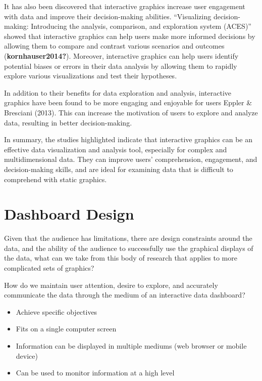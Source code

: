 \documentclass[print]{nuthesis}
\providecommand{\tightlist}{%
  \setlength{\itemsep}{0pt}\setlength{\parskip}{0pt}}
\begin{document}
It has also been discovered that interactive graphics increase user engagement with data and improve their decision-making abilities.
``Visualizing decision-making: Introducing the analysis, comparison, and exploration system (ACES)'' showed that interactive graphics can help users make more informed decisions by allowing them to compare and contrast various scenarios and outcomes (\textbf{kornhauser2014?}).
Moreover, interactive graphics can help users identify potential biases or errors in their data analysis by allowing them to rapidly explore various visualizations and test their hypotheses.

In addition to their benefits for data exploration and analysis, interactive graphics have been found to be more engaging and enjoyable for users Eppler \& Bresciani (2013).
This can increase the motivation of users to explore and analyze data, resulting in better decision-making.

In summary, the studies highlighted indicate that interactive graphics can be an effective data visualization and analysis tool, especially for complex and multidimensional data.
They can improve users' comprehension, engagement, and decision-making skills, and are ideal for examining data that is difficult to comprehend with static graphics.

\hypertarget{dashboard-design}{%
\section{Dashboard Design}\label{dashboard-design}}

Given that the audience has limitations, there are design constraints around the data, and the ability of the audience to successfully use the graphical displays of the data, what can we take from this body of research that applies to more complicated sets of graphics?

How do we maintain user attention, desire to explore, and accurately communicate the data through the medium of an interactive data dashboard?


\begin{itemize}
\tightlist
\item
  Achieve specific objectives
\item
  Fits on a single computer screen
\item
  Information can be displayed in multiple mediums (web browser or mobile device)
\item
  Can be used to monitor information at a high level
\end{itemize}
\end{document}

